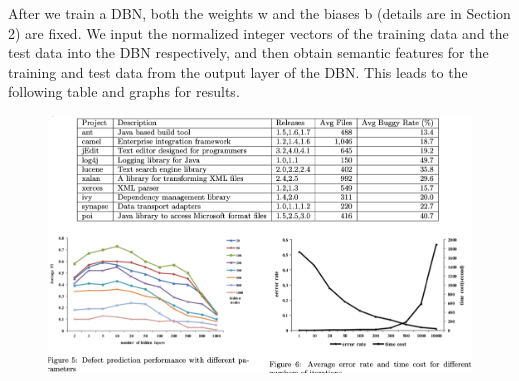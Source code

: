 \documentclass{article}
\begin{document}
After we train a DBN, both the weights w and the biases b (details are in Section 2) are fixed. We input the normalized integer vectors of the training data and the test data into the DBN respectively, and then obtain semantic features for the training and test data from the output layer of the DBN.
This leads to the following table and graphs for results. 
\begin{figure}[ht]
\vskip 0.2in
\begin{center}
\centerline{\includegraphics[width=\columnwidth]{Images/Bug3-1.png}}
\label{icml-historical}
\end{center}
\vskip -0.2in
\end{figure}
\end{document}
